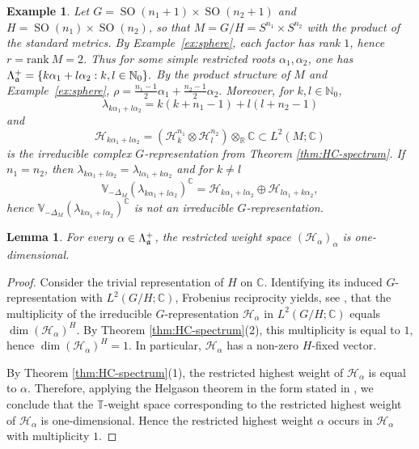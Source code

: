 \documentclass[reqno,twoside,12pt]{amsart}
\newtheorem{Example}[Remark]{Example}
\newtheorem{Lemma}[Remark]{Lemma}
\newcommand{\bC}{\mathbb{C}}
\newcommand{\bN}{\mathbb{N}}
\newcommand{\bR}{\mathbb{R}}
\newcommand{\bT}{\mathbb{T}}
\newcommand{\bV}{\mathbb{V}}
\newcommand{\cH}{\mathcal{H}}
\numberwithin{equation}{section} \errorcontextlines=0
\newcommand{\rank}{\mathrm{rank}\:}
\newcommand{\SO}{\operatorname{SO}}
\begin{document}
\begin{Example}\label{ex:product-spheres}
Let $G=\SO(n_1+1)\times\SO(n_2+1)$ and $H=\SO(n_1)\times\SO(n_2)$, so that $M=G/H=S^{n_1}\times S^{n_2}$ with the product of the standard metrics. By Example~\ref{ex:sphere}, each factor has rank $1$, hence $r=\rank M=2$. Thus for some simple restricted roots $\alpha_1,\alpha_2$, one has
$
\Lambda_{\frak a}^+=\{k\alpha_1+l\alpha_2:k,l\in\bN_0\}.
$
By the product structure of $M$ and Example~\ref{ex:sphere},
$
\rho=\frac{n_1-1}{2}\alpha_1+\frac{n_2-1}{2}\alpha_2.
$
Moreover, for $k,l\in\bN_0$,
\[
\lambda_{k\alpha_1+l\alpha_2}=k(k+n_1-1)+l(l+n_2-1)
\]
and
\[
\cH_{k\alpha_1+l\alpha_2}=\left(\cH^{n_1}_{k}\otimes\cH^{n_2}_{l}\right)\otimes_\bR\bC\subset L^2(M;\bC)
\]
is the irreducible complex $G$-representation from Theorem \ref{thm:HC-spectrum}. If $n_1=n_2$, then $\lambda_{k\alpha_1+l\alpha_2}=\lambda_{l\alpha_1+k\alpha_2}$ and for $k\ne l$
\[
\bV_{-\Delta_M}(\lambda_{k\alpha_1+l\alpha_2})^\bC=\cH_{k\alpha_1+l\alpha_2}\oplus\cH_{l\alpha_1+k\alpha_2},
\]
hence $\bV_{-\Delta_M}(\lambda_{k\alpha_1+l\alpha_2})^\bC$ is not an irreducible $G$-representation.
\end{Example}


\begin{Lemma}\label{lem:highest}
For every $\alpha\in\Lambda_{\frak a}^+$, the restricted weight space $(\cH_\alpha)_\alpha$ is one-dimensional.
\end{Lemma}

\begin{proof}
Consider the trivial representation of $H$ on $\bC$. Identifying its induced $G$-rep\-re\-sen\-ta\-tion with $L^2(G/H;\bC)$, Frobenius reciprocity yields, see \cite[Thm.~9.9]{KnappLie}, that the multiplicity of the irreducible $G$-representation $\cH_\alpha$ in $L^2(G/H;\bC)$ equals $\dim (\cH_\alpha)^H$.
By Theorem \ref{thm:HC-spectrum}(2), this multiplicity is equal to $1$, hence $\dim (\cH_\alpha)^H=1$. In particular, $\cH_\alpha$ has a non-zero $H$-fixed vector.

By Theorem \ref{thm:HC-spectrum}(1), the restricted highest weight of $\cH_\alpha$ is equal to $\alpha$. Therefore, applying the Helgason theorem in the form stated in \cite[Thm.~8.49]{KnappLie}, we conclude that the $\bT$-weight space corresponding to the restricted highest weight of $\cH_\alpha$ is one-dimensional. Hence the restricted highest weight $\alpha$ occurs in $\cH_\alpha$ with multiplicity $1$.
\end{proof}
\end{document}
